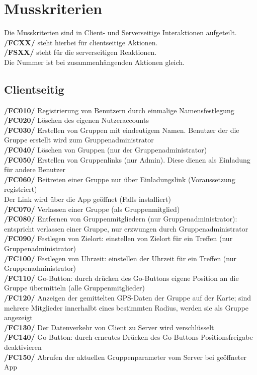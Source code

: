 \newpage
\section{Musskriterien}
Die Musskriterien sind in Client- und Serverseitige Interaktionen aufgeteilt.\\
\textbf{/FCXX/} steht hierbei für clientseitige Aktionen.\\
\textbf{/FSXX/} steht für die serverseitigen Reaktionen.\\
Die Nummer ist bei zusammenhängenden Aktionen gleich.\\
\subsection{Clientseitig}
     \textbf{/FC010/} Registrierung von Benutzern durch einmalige Namensfestlegung\\
     \textbf{/FC020/} Löschen des eigenen Nutzeraccounts\\
     \textbf{/FC030/} Erstellen von Gruppen mit eindeutigem Namen. Benutzer der die Gruppe erstellt wird zum Gruppenadministrator\\
     \textbf{/FC040/} Löschen von Gruppen (nur der Gruppenadministrator)   \\
     \textbf{/FC050/} Erstellen von Gruppenlinks (nur Admin). Diese dienen als Einladung für andere Benutzer \\
     \textbf{/FC060/} Beitreten einer Gruppe nur über Einladungslink (Voraussetzung registriert) \\
     Der Link wird über die App geöffnet (Falls installiert) \\
     \textbf{/FC070/} Verlassen einer Gruppe (als Gruppenmitglied)\\
     \textbf{/FC080/} Entfernen von Gruppenmitgliedern (nur Gruppenadministrator): entspricht verlassen einer Gruppe, nur erzwungen durch Gruppenadministrator\\
     \textbf{/FC090/} Festlegen von Zielort: einstellen von Zielort für ein Treffen (nur Gruppenadministrator)\\
     \textbf{/FC100/} Festlegen von Uhrzeit: einstellen der Uhrzeit für ein Treffen (nur Gruppenadministrator) \\
     \textbf{/FC110/} Go-Button: durch drücken des Go-Buttons eigene Position an die Gruppe übermitteln (alle Gruppenmitglieder)\\
     \textbf{/FC120/} Anzeigen der gemittelten GPS-Daten der Gruppe auf der Karte; sind mehrere Mitglieder innerhalbt eines bestimmten Radius,
     werden sie als Gruppe angezeigt\\
     \textbf{/FC130/} Der Datenverkehr von Client zu Server wird verschlüsselt\\
     \textbf{/FC140/} Go-Button: durch erneutes Drücken des Go-Buttons Positionsfreigabe deaktivieren\\
     \textbf{/FC150/} Abrufen der aktuellen Gruppenparameter vom Server bei geöffneter App\\
